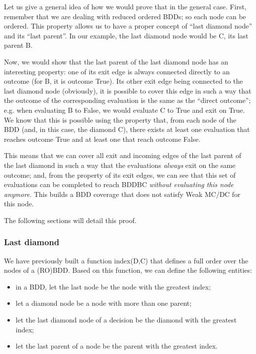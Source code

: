 \documentclass[a4paper,12pt,twoside]{article}
\begin{document}
Let us give a general idea of how we would prove that in the general
case. First, remember that we are dealing with reduced ordered BDDs;
so each node can be ordered. This property allows us to have a
proper concept of ``last diamond node'' and its ``last parent''. In our
example, the last diamond node would be C, its last parent B.

Now, we would show that the last parent of the last diamond node has
an interesting property: one of its exit edge is always connected
directly to an outcome (for B, it is outcome True). Its other exit
edge being connected to the last diamond node (obviously), it is
possible to cover this edge in such a way that the outcome of the
corresponding evaluation is the same as the ``direct outcome'';
e.g. when evaluating B to False, we would evaluate C to True and exit
on True. We know that this is possible using the property that, from
each node of the BDD (and, in this case, the diamond C), there exists
at least one evaluation that reaches outcome True and at least one that
reach outcome False.

This means that we can cover all exit and incoming edges of the last
parent of the last diamond in such a way that the evaluations \textit{always}
exit on the same outcome; and, from the property of its exit edges, we
can see that this set of evaluations can be completed to reach BDDBC
\textit{without evaluating this node anymore}. This builds a BDD coverage
that does not satisfy Weak MC/DC for this node.

The following sections will detail this proof.

\subsubsection{Last diamond}

We have previously built a function index(D,C) that defines a full
order over the nodes of a (RO)BDD. Based on this function, we can
define the following entities:
\begin{itemize}
\item in a BDD, let the last node be the node with the greatest index;
\item let a diamond node be a node with more than one parent;
\item let the last diamond node of a decision be the diamond with the
      greatest index;
\item let the last parent of a node be the parent with the greatest index.
\end{itemize}
\end{document}
